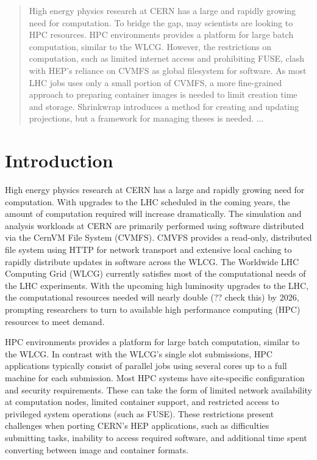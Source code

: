 \documentclass[conference]{IEEEtran}
\begin{document}
\maketitle

\begin{abstract}
High energy physics research at CERN has a large and rapidly growing need for computation.
To bridge the gap, may scientists are looking to HPC resources.
HPC environments provides a platform for large
batch computation, similar to the WLCG.
However, the restrictions on computation,
such as limited internet access and prohibiting FUSE,
clash with HEP's reliance on CVMFS as global filesystem
for software.
As most LHC jobs uses 
only a small portion of CVMFS,
a more fine-grained approach to preparing container images 
is needed to limit creation time and storage.
Shrinkwrap introduces a method for creating and
updating projections, but a framework for managing
theses is needed.
...
\end{abstract}



\section{Introduction}

High energy physics research at CERN has a large and rapidly growing need for computation.
With upgrades to the LHC scheduled in the coming years,
the amount of computation required will increase dramatically.
The simulation and analysis workloads at CERN are primarily performed using software distributed
via the CernVM File System (CVMFS).
CMVFS provides a read-only, distributed file system using HTTP for network transport and extensive local
caching to rapidly distribute updates in software across the WLCG.
The Worldwide LHC Computing Grid (WLCG) currently satisfies most of the computational needs of the LHC experiments.
With the upcoming high luminosity upgrades to the LHC,
the computational resources needed will nearly double (?? check this) by 2026,
prompting researchers to turn to available high performance computing (HPC) resources to meet demand.

HPC environments provides a platform for large
batch computation, similar to the WLCG.
In contrast with the WLCG's single slot submissions,
HPC applications typically consist of parallel jobs using several cores up to a full machine for each submission.
Most HPC systems have site-specific configuration and security requirements.
These can take the form of limited network availability at computation nodes,
limited container support,
and restricted access to privileged system operations (such as FUSE).
These restrictions present challenges when porting CERN's HEP applications,
such as difficulties submitting tasks,
inability to access required software,
and additional time spent converting between image and container formats.
\end{document}
